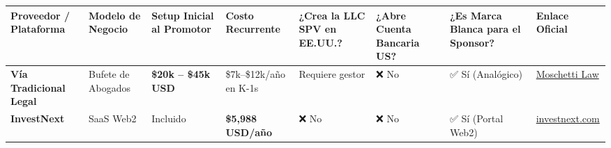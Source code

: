 \documentclass[
]{article}
\newcounter{none} %
\begin{document}
{\def\LTcaptype{none} %
\begin{longtable}[]{@{}
  >{\raggedright\arraybackslash}p{}
  >{\raggedright\arraybackslash}p{}
  >{\centering\arraybackslash}p{}
  >{\centering\arraybackslash}p{}
  >{\centering\arraybackslash}p{}
  >{\centering\arraybackslash}p{}
  >{\centering\arraybackslash}p{}
  >{\raggedright\arraybackslash}p{}@{}}
\toprule\noalign{}
\begin{minipage}[b]{\linewidth}\raggedright
Proveedor / Plataforma
\end{minipage} & \begin{minipage}[b]{\linewidth}\raggedright
Modelo de Negocio
\end{minipage} & \begin{minipage}[b]{\linewidth}\centering
Setup Inicial al Promotor
\end{minipage} & \begin{minipage}[b]{\linewidth}\centering
Costo Recurrente
\end{minipage} & \begin{minipage}[b]{\linewidth}\centering
¿Crea la LLC SPV en EE.UU.?
\end{minipage} & \begin{minipage}[b]{\linewidth}\centering
¿Abre Cuenta Bancaria US?
\end{minipage} & \begin{minipage}[b]{\linewidth}\centering
¿Es Marca Blanca para el Sponsor?
\end{minipage} & \begin{minipage}[b]{\linewidth}\raggedright
Enlace Oficial
\end{minipage} \\
\midrule\noalign{}
\endhead
\bottomrule\noalign{}
\endlastfoot
\textbf{Vía Tradicional Legal} & Bufete de Abogados & \textbf{\$20k --
\$45k USD} & \$7k--\$12k/año en K-1s & Requiere gestor & ❌ No & ✅ Sí
(Analógico) &
\href{https://moschettilaw.com/syndication-attorney-fees/}{Moschetti
Law} \\
\textbf{InvestNext} & SaaS Web2 & Incluido & \textbf{\$5,988 USD/año} &
❌ No & ❌ No & ✅ Sí (Portal Web2) &
\href{https://investnext.com}{investnext.com} \\

\end{longtable}}
\end{document}
